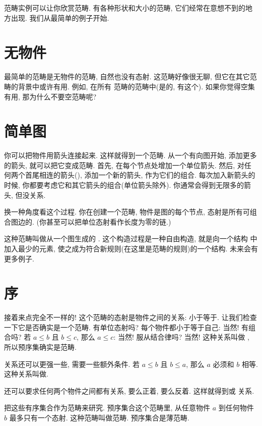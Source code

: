 
\lettrine[lhang=0.17]
{范}畴实例可以让你欣赏范畴. 有各种形状和大小的范畴, 它们经常在意想不到的地方出现. 我们从最简单的例子开始.

\section{无物件}

最简单的范畴是无物件的范畴, 自然也没有态射. 这范畴好像很无聊, 但它在其它范畴的背景中或许有用. 例如, 在所有
范畴的范畴中(是的, 有这个). 如果你觉得空集有用, 那为什么不要空范畴呢?

\section{简单图}

你可以把物件用箭头连接起来. 这样就得到一个范畴. 从一个有向图开始, 添加更多的箭头, 就可以把它变成范畴. 首先,
在每个节点处增加一个单位箭头. 然后, 对任何两个首尾相连的箭头(), 添加一个新的箭头,
作为它们的组合. 每次加入新箭头的时候, 你都要考虑它和其它箭头的组合(单位箭头除外). 你通常会得到无限多的箭头, 但没关系.

换一种角度看这个过程. 你在创建一个范畴, 物件是图的每个节点, 态射是所有可组合图边的.
(你甚至可以把单位态射看作长度为零的链.)

这种范畴叫做从一个图生成的 . 这个构造过程是一种自由构造, 就是向一个结构
中加入最少的元素, 使之成为符合新规则(在这里是范畴的规则)的一个结构. 未来会有更多例子.

\section{序}

接着来点完全不一样的! 这个范畴的态射是物件之间的关系: 小于等于. 让我们检查一下它是否确实是一个范畴. 有单位态射吗?
每个物件都小于等于自己: 当然! 有组合吗? 若 $a \leqslant b$ 且 $b \leqslant c$, 那么 $a \leqslant c$: 当然!
服从结合律吗? 当然! 这种关系叫做 , 所以预序集确实是范畴.

关系还可以更强一些, 需要一些额外条件. 若 $a \leqslant b$ 且 $b \leqslant a$, 那么 $a$ 必须和 $b$ 相等.
这种关系叫做.

还可以要求任何两个物件之间都有关系, 要么正着, 要么反着. 这样就得到或
关系.

把这些有序集合作为范畴来研究. 预序集合这个范畴里, 从任意物件 $a$ 到任何物件 $b$ 最多只有一个态射.
这种范畴叫做范畴. 预序集合是薄范畴.

